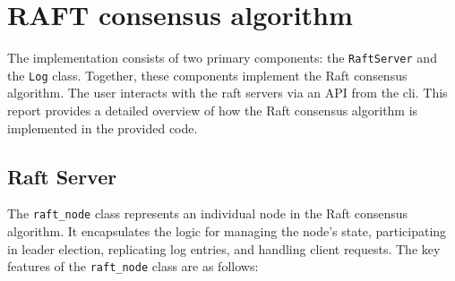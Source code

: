 \documentclass{article}
\begin{document}
\section{RAFT consensus algorithm}
The implementation consists of two primary components: the \texttt{RaftServer} and 
the \texttt{Log} class. Together, these components implement the Raft consensus 
algorithm. The user interacts with the raft servers via an API from the cli. This report provides 
a detailed overview of 
how the Raft consensus algorithm is implemented in the provided code.

\subsection{Raft Server}

The \texttt{raft\_node} class represents an individual node in the Raft consensus 
algorithm. It encapsulates the logic for managing the node's state, participating in 
leader election, replicating log entries, and handling client requests. The key features 
of the \texttt{raft\_node} class are as follows:
\end{document}

